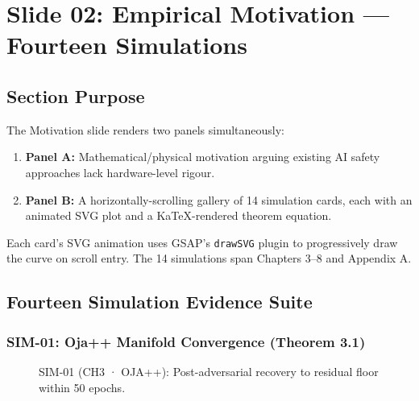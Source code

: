 \documentclass[12pt, a4paper]{article}
\begin{document}
\section{Slide 02: Empirical Motivation — Fourteen Simulations}
\label{sec:motivation}

\subsection{Section Purpose}

The Motivation slide renders two panels simultaneously:
\begin{enumerate}[noitemsep]
  \item \textbf{Panel A:} Mathematical/physical motivation arguing existing AI safety approaches lack hardware-level rigour.
  \item \textbf{Panel B:} A horizontally-scrolling gallery of 14 simulation cards, each with an animated SVG plot and a KaTeX-rendered theorem equation.
\end{enumerate}

Each card's SVG animation uses GSAP's \texttt{drawSVG} plugin to progressively draw the
curve on scroll entry. The 14 simulations span Chapters 3--8 and Appendix A.

\subsection{Fourteen Simulation Evidence Suite}

\subsubsection{SIM-01: Oja++ Manifold Convergence (Theorem 3.1)}

\begin{figure}[H]
  \centering
  \caption{SIM-01 (CH3 · OJA++): Post-adversarial recovery to residual floor within 50 epochs.}
  \label{fig:sim01}
\end{figure}
\end{document}
